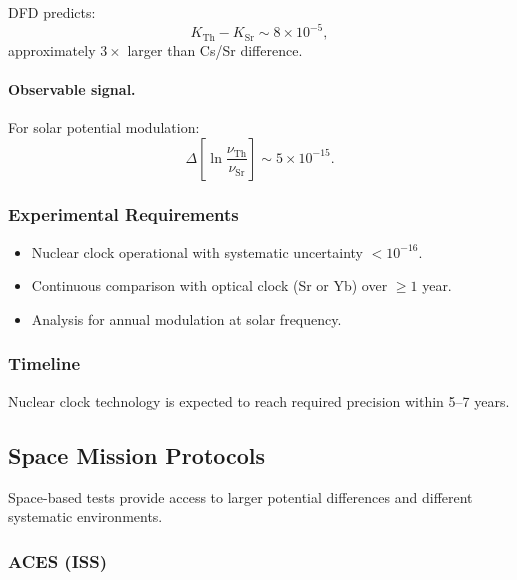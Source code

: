 DFD predicts:
\begin{equation}
K_{\mathrm{Th}} - K_{\mathrm{Sr}} \sim 8 \times 10^{-5},
\end{equation}
approximately $3\times$ larger than Cs/Sr difference.

\paragraph{Observable signal.}
For solar potential modulation:
\begin{equation}
\Delta\left[\ln\frac{\nu_{\mathrm{Th}}}{\nu_{\mathrm{Sr}}}\right] \sim 5 \times 10^{-15}.
\end{equation}

\subsubsection{Experimental Requirements}

\begin{itemize}
\item Nuclear clock operational with systematic uncertainty $< 10^{-16}$.
\item Continuous comparison with optical clock (Sr or Yb) over $\geq 1$ year.
\item Analysis for annual modulation at solar frequency.
\end{itemize}

\subsubsection{Timeline}

Nuclear clock technology is expected to reach required precision within 5--7 years.

\subsection{Space Mission Protocols}\label{app:proto-space}

Space-based tests provide access to larger potential differences and 
different systematic environments.

\subsubsection{ACES (ISS)}

